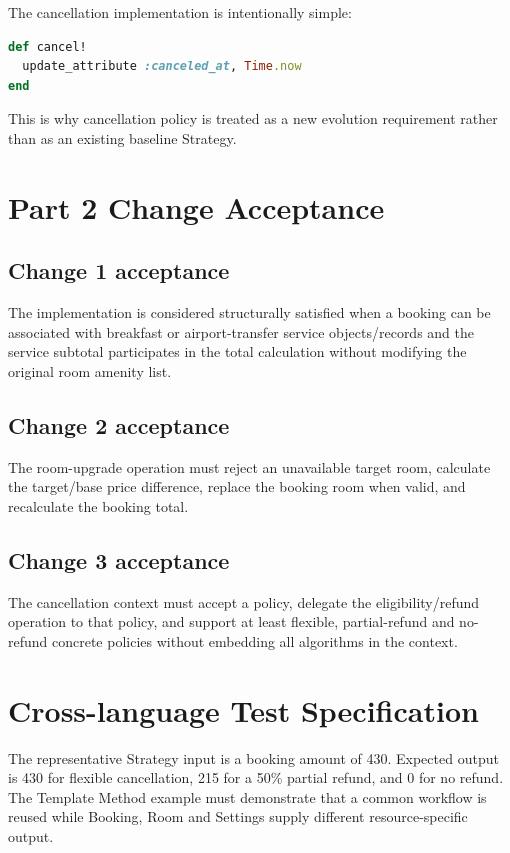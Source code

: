 \documentclass[10pt,a4paper]{article}
\begin{document}
The cancellation implementation is intentionally simple:

\begin{lstlisting}[language=Ruby,caption={Baseline cancellation behavior}]
def cancel!
  update_attribute :canceled_at, Time.now
end
\end{lstlisting}

This is why cancellation policy is treated as a new evolution requirement rather than as an existing baseline Strategy.

\section{Part 2 Change Acceptance}

\subsection{Change 1 acceptance}

The implementation is considered structurally satisfied when a booking can be associated with breakfast or airport-transfer service objects/records and the service subtotal participates in the total calculation without modifying the original room amenity list.

\subsection{Change 2 acceptance}

The room-upgrade operation must reject an unavailable target room, calculate the target/base price difference, replace the booking room when valid, and recalculate the booking total.

\subsection{Change 3 acceptance}

The cancellation context must accept a policy, delegate the eligibility/refund operation to that policy, and support at least flexible, partial-refund and no-refund concrete policies without embedding all algorithms in the context.

\section{Cross-language Test Specification}

The representative Strategy input is a booking amount of 430. Expected output is 430 for flexible cancellation, 215 for a 50\% partial refund, and 0 for no refund. The Template Method example must demonstrate that a common workflow is reused while Booking, Room and Settings supply different resource-specific output.
\end{document}
